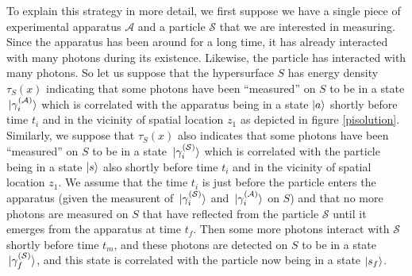 To explain this strategy in more detail, we first suppose we have a single piece of experimental apparatus $\mathcal{A}$ and a particle $\mathcal{S}$ that we are interested in measuring. Since the apparatus has been around for a long time, it has already interacted with many photons during its existence. Likewise, the particle has interacted with many photons. So let us suppose that the hypersurface $S$ has energy density $\tau_S(x)$ indicating that some photons have been ``measured'' on $S$ to be in a state $\ket*{\gamma_i^{(\mathcal{A})}}$ which is correlated with the apparatus being in a state $\ket{a}$ shortly before time $t_i$ and in the vicinity of spatial location $z_1$ as depicted in figure \ref{pisolution}. Similarly, we suppose that $\tau_S(x)$ also indicates that some photons have been ``measured'' on $S$ to be in a state $\ket*{\gamma_i^{(\mathcal{S})}}$ which is correlated with the particle being in a state $\ket{s}$ also shortly before time $t_i$ and in the vicinity of spatial location $z_1$. We assume that the time $t_i$ is just before the particle enters the apparatus (given the measurent of $\ket*{\gamma_i^{(\mathcal{S})}}$ and  $\ket*{\gamma_i^{(\mathcal{A})}}$ on $S$) and that no more photons are measured on $S$ that have reflected from the particle $\mathcal{S}$ until it emerges from the apparatus at time $t_f$. Then some more photons interact with $\mathcal{S}$ shortly before time $t_m$, and these photons are detected on $S$ to be in a state  $\ket*{\gamma_f^{(\mathcal{S})}}$, and this state is correlated with the particle now being in a state $\ket{s_{f}}$. 

